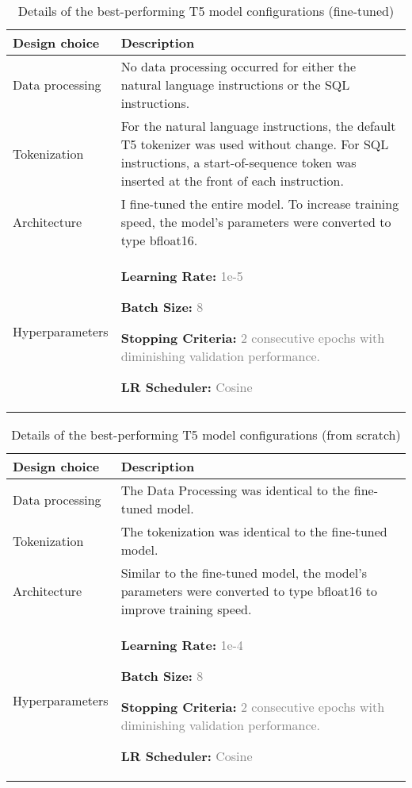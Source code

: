 \documentclass{article}
\begin{document}
\begin{table}[h!]
\centering
\begin{tabular}{p{3.5cm}p{10cm}}
\toprule
Design choice & Description \\
\midrule
Data processing & No data processing occurred for either the natural language instructions or the SQL instructions. \\
Tokenization & For the natural language instructions, the default T5 tokenizer was used without change. For SQL instructions, a start-of-sequence token was inserted at the front of each instruction. \\
Architecture & I fine-tuned the entire model. To increase training speed, the model's parameters were converted to type bfloat16. \\
Hyperparameters & 
\textbf{Learning Rate:} \textcolor{gray}{1e-5}
 
\textbf{Batch Size:} \textcolor{gray}{8} 

\textbf{Stopping Criteria:} \textcolor{gray}{2 consecutive epochs with diminishing validation performance.} 

\textbf{LR Scheduler:} \textcolor{gray}{Cosine}  \\
\bottomrule
\end{tabular}
\caption{Details of the best-performing T5 model configurations (fine-tuned)}
\label{tab:t5_results_ft}
\end{table}


\begin{table}[h!]
\centering
\begin{tabular}{p{3.5cm}p{10cm}}
\toprule
Design choice & Description \\
\midrule
Data processing & The Data Processing was identical to the fine-tuned model. \\
Tokenization & The tokenization was identical to the fine-tuned model. \\
Architecture & Similar to the fine-tuned model, the model's parameters were converted to type bfloat16 to improve training speed. \\
Hyperparameters & \textbf{Learning Rate:} \textcolor{gray}{1e-4}

\textbf{Batch Size:} \textcolor{gray}{8} 

\textbf{Stopping Criteria:} \textcolor{gray}{2 consecutive epochs with diminishing validation performance.} 

\textbf{LR Scheduler:} \textcolor{gray}{Cosine}  \\
\bottomrule
\end{tabular}
\caption{Details of the best-performing T5 model configurations (from scratch)}
\label{tab:t5_results_scratch}
\end{table}
\end{document}

